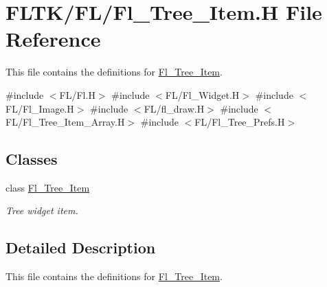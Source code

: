 \hypertarget{_fl___tree___item_8_h}{}\section{F\+L\+T\+K/\+F\+L/\+Fl\+\_\+\+Tree\+\_\+\+Item.H File Reference}
\label{_fl___tree___item_8_h}


This file contains the definitions for \hyperlink{class_fl___tree___item}{Fl\+\_\+\+Tree\+\_\+\+Item}.  


{\ttfamily \#include $<$F\+L/\+Fl.\+H$>$}\newline
{\ttfamily \#include $<$F\+L/\+Fl\+\_\+\+Widget.\+H$>$}\newline
{\ttfamily \#include $<$F\+L/\+Fl\+\_\+\+Image.\+H$>$}\newline
{\ttfamily \#include $<$F\+L/fl\+\_\+draw.\+H$>$}\newline
{\ttfamily \#include $<$F\+L/\+Fl\+\_\+\+Tree\+\_\+\+Item\+\_\+\+Array.\+H$>$}\newline
{\ttfamily \#include $<$F\+L/\+Fl\+\_\+\+Tree\+\_\+\+Prefs.\+H$>$}\newline
\subsection*{Classes}
\begin{DoxyCompactItemize}
\item 
class \hyperlink{class_fl___tree___item}{Fl\+\_\+\+Tree\+\_\+\+Item}
\begin{DoxyCompactList}\small\item\em Tree widget item. \end{DoxyCompactList}\end{DoxyCompactItemize}


\subsection{Detailed Description}
This file contains the definitions for \hyperlink{class_fl___tree___item}{Fl\+\_\+\+Tree\+\_\+\+Item}. 

